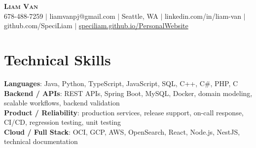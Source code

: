 \documentclass[letterpaper,11pt]{article}
\begin{document}

%
\begin{center}
    \textbf{\Huge \scshape Liam Van} \\ \vspace{1pt}
    \small 678-488-7259 $|$ \small {liamvanpj@gmail.com} $|$ Seattle, WA
 {{$|$ linkedin.com/in/liam-van} {$|$ github.com/SpeciLiam} {$|$ \href{https://speciliam.github.io/PersonalWebsite}{speciliam.github.io/PersonalWebsite}}}

\end{center}

\section{Technical Skills}
 \begin{itemize}[leftmargin=0.15in, label={}]
    \small{\item{
     \textbf{Languages}{: Java, Python, TypeScript, JavaScript, SQL, C++, C\#, PHP, C} \\
     \textbf{Backend / APIs}{: REST APIs, Spring Boot, MySQL, Docker, domain modeling, scalable workflows, backend validation} \\
     \textbf{Product / Reliability}{: production services, release support, on-call response, CI/CD, regression testing, unit testing} \\
     \textbf{Cloud / Full Stack}{: OCI, GCP, AWS, OpenSearch, React, Node.js, NestJS, technical documentation} \\
    }}
 \end{itemize}
%
\end{document}
